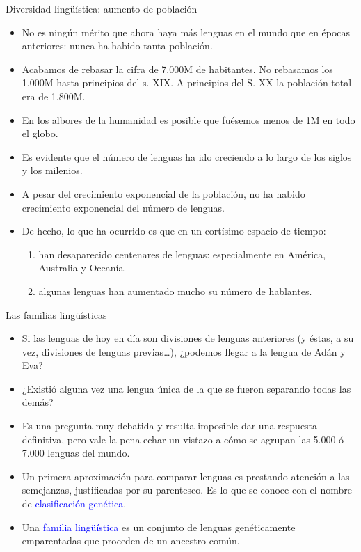 \documentclass[handout]{beamer}
\begin{document}
\begin{frame}{Diversidad lingüística: aumento de población}
\begin{itemize}
	\item No es ningún mérito que ahora haya más lenguas en el mundo que en épocas anteriores: nunca ha habido tanta población. 
	\item Acabamos de rebasar la cifra de 7.000M de habitantes. No rebasamos los 1.000M hasta principios del s. XIX. A principios del S. XX la población total era de 1.800M. 
	\item En los albores de la humanidad es posible que fuésemos menos de 1M en todo el globo.
	\item Es evidente que el número de lenguas ha ido creciendo a lo largo de los siglos y los milenios.
	\item A pesar del crecimiento exponencial de la población, no ha habido crecimiento exponencial del número de lenguas.
	\item De hecho, lo que ha ocurrido es que en un cortísimo espacio de tiempo:
	\begin{enumerate}
		\item han desaparecido centenares de lenguas: especialmente en América, Australia y Oceanía.
		\item algunas lenguas han aumentado mucho su número de hablantes.
	\end{enumerate} 
\end{itemize}
\end{frame}

\begin{frame}{Las familias lingüísticas}
\begin{itemize}
	\item Si las lenguas de hoy en día son divisiones de lenguas anteriores (y éstas, a su vez, divisiones de lenguas previas\ldots), ¿podemos llegar a la lengua de Adán y Eva?
	\item ¿Existió alguna vez una lengua única de la que se fueron separando todas las demás?
	\item Es una pregunta muy debatida y resulta imposible dar una respuesta definitiva, pero vale la pena echar un vistazo a cómo se agrupan las 5.000 ó 7.000 lenguas del mundo.
	\item Un primera aproximación para comparar lenguas es prestando atención a las semejanzas, justificadas por su parentesco. Es lo que se conoce con el nombre de \textcolor{blue}{clasificación genética}.
	\item Una \textcolor{blue}{familia lingüística} es un conjunto de lenguas genéticamente emparentadas que proceden de un ancestro común.
\end{itemize}

\end{frame}
\end{document}
